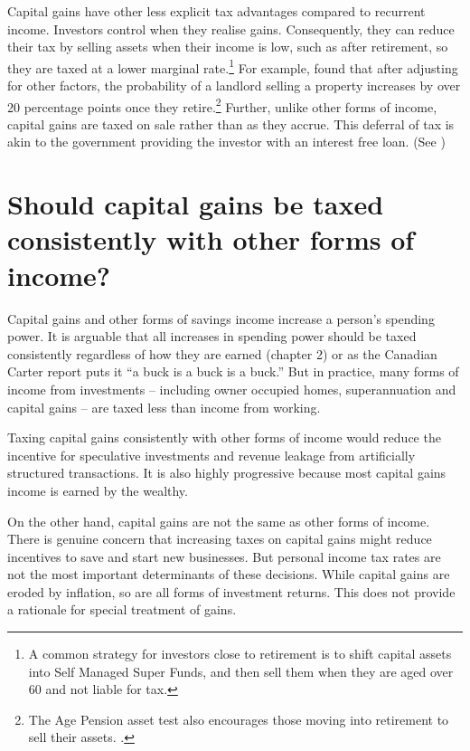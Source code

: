 \documentclass{grattan}\usepackage[]{graphicx}\usepackage[]{color}
\begin{document}
Capital gains have other less explicit tax advantages compared to recurrent income. Investors control when they realise gains. Consequently, they can reduce their tax by selling assets when their income is low, such as after retirement, so they are taxed at a lower marginal rate.\footnote{A common strategy for investors close to retirement is to shift capital assets into Self Managed Super Funds, and then sell them when they are aged over 60 and not liable for tax.}  For example, \textcite{Wood2010a} found that after adjusting for other factors, the probability of a landlord selling a property increases by over 20 percentage points once they retire.\footnote{The Age Pension asset test also encourages those moving into retirement to sell their assets. \textcite{Wood2010a}.}
Further, unlike other forms of income, capital gains are taxed on sale rather than as they accrue. This deferral of tax is akin to the government providing the investor with an interest free loan. (See )

\section{Should capital gains be taxed consistently with other forms of income?}\label{sec:ShouldCapitalGainsBeTaxedConsistently}
Capital gains and other forms of savings income increase a person's spending power. It is arguable that all increases in spending power should be taxed consistently regardless of how they are earned (chapter 2)  or as the Canadian Carter report puts it ``a buck is a buck is a buck.''  But in practice, many forms of income from investments -- including owner occupied homes,  superannuation  and capital gains -- are taxed less than income from working. 

Taxing capital gains consistently with other forms of income would reduce the incentive for speculative investments and revenue leakage from artificially structured transactions. It is also highly progressive because most capital gains income is earned by the wealthy. 

On the other hand, capital gains are not the same as other forms of income. There is genuine concern that increasing taxes on capital gains might reduce incentives to save and start new businesses. But personal income tax rates are not the most important determinants of these decisions. While capital gains are eroded by inflation, so are all forms of investment returns. This does not provide a rationale for special treatment of gains. 
\end{document}
